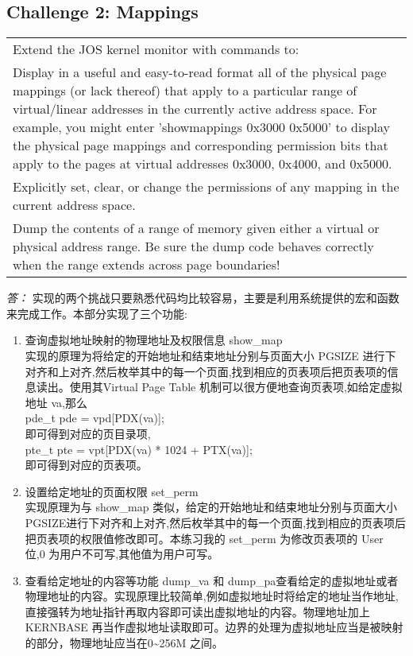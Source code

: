 \documentclass[11pt,a4paper]{article}
\begin{document}
\subsection{Challenge 2: Mappings}
\begin{tabular}{|p{\textwidth}|}
\hline
Extend the JOS kernel monitor with commands to:\\
\hspace{2em}Display in a useful and easy-to-read format all of the physical page mappings (or lack thereof) that apply to a particular range of virtual/linear addresses in the currently active address space. For example, you might enter 'showmappings 0x3000 0x5000' to display the physical page mappings and corresponding permission bits that apply to the pages at virtual addresses 0x3000, 0x4000, and 0x5000.\\
\hspace{2em}Explicitly set, clear, or change the permissions of any mapping in the current address space.\\
\hspace{2em}Dump the contents of a range of memory given either a virtual or physical address range. Be sure the dump code behaves correctly when the range extends across page boundaries!\\
\hline
\end{tabular}
\textit{\large{答：}}
实现的两个挑战只要熟悉代码均比较容易，主要是利用系统提供的宏和函数来完成工作。本部分实现了三个功能:\\
\begin{enumerate}
\item 查询虚拟地址映射的物理地址及权限信息 show\_map\\
实现的原理为将给定的开始地址和结束地址分别与页面大小 PGSIZE 进行下对齐和上对齐,然后枚举其中的每一个页面,找到相应的页表项后把页表项的信息读出。使用其Virtual Page Table 机制可以很方便地查询页表项,如给定虚拟地址 va,那么\\
\indent pde\_t pde = vpd[PDX(va)];\\
即可得到对应的页目录项,\\
\indent pte\_t pte = vpt[PDX(va) * 1024 + PTX(va)];\\
即可得到对应的页表项。\\
\item 设置给定地址的页面权限 set\_perm\\
实现原理为与 show\_map 类似，给定的开始地址和结束地址分别与页面大小 PGSIZE进行下对齐和上对齐,然后枚举其中的每一个页面,找到相应的页表项后把页表项的权限值修改即可。本练习我的 set\_perm 为修改页表项的 User 位,0 为用户不可写,其他值为用户可写。\\
\item 查看给定地址的内容等功能 dump\_va 和 dump\_pa查看给定的虚拟地址或者物理地址的内容。实现原理比较简单,例如虚拟地址时将给定的地址当作地址,直接强转为地址指针再取内容即可读出虚拟地址的内容。物理地址加上 KERNBASE 再当作虚拟地址读取即可。边界的处理为虚拟地址应当是被映射的部分，物理地址应当在0\~{}256M 之间。\\
\end{enumerate}
\end{document}
